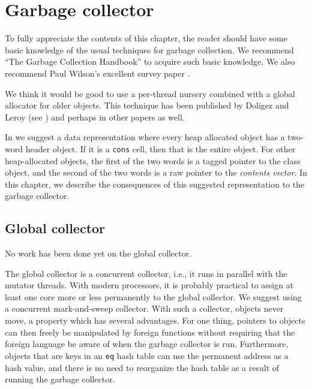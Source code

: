\chapter{Garbage collector}

To fully appreciate the contents of this chapter, the reader should
have some basic knowledge of the usual techniques for garbage
collection.  We recommend ``The Garbage Collection Handbook''
\cite{Jones:2011:GCH:2025255} to acquire such basic knowledge.  We
also recommend Paul Wilson's excellent survey paper
\cite{Wilson:1992:UGC:645648.664824}.

We think it would be good to use a per-thread nursery combined with a
global allocator for older objects.  This technique has been published
by Doligez and Leroy (see \cite{Doligez:1993:CGG:158511.158611}) and
perhaps in other papers as well.

In  we suggest a data representation
where every heap allocated object has a two-word header object.  If it
is a \texttt{cons} cell, then that is the entire object.  For other
heap-allocated objects, the first of the two words is a tagged pointer
to the class object, and the second of the two words is a raw pointer
to the \emph{contents vector}.  In this chapter, we describe the
consequences of this suggested representation to the garbage
collector. 

\section{Global collector}
No work has been done yet on the global collector.  

The global collector is a concurrent collector, i.e., it runs in
parallel with the mutator threads.  With modern processors, it is
probably practical to assign at least one core more or less
permanently to the global collector.  We suggest using a concurrent
mark-and-sweep collector.  With such a collector, objects
never move, a property which has several advantages.  For one thing,
pointers to objects can then freely be manipulated by foreign
functions without requiring that the foreign language be aware of when
the garbage collector is run.  Furthermore, objects that are keys in
an \texttt{eq} hash table can use the permanent address as a hash
value, and there is no need to reorganize the hash table as a result
of running the garbage collector. 

